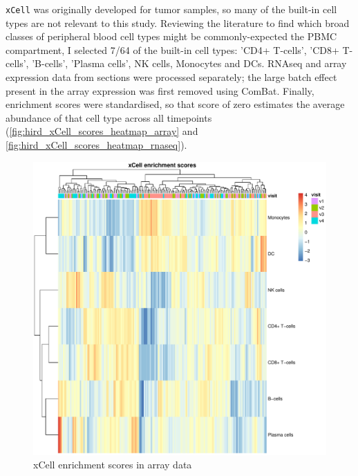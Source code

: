 %
\texttt{xCell} was originally developed for tumor samples, so many of the built-in cell types are not relevant to this study.
Reviewing the literature to find which broad classes of peripheral blood cell types might be commonly-expected the \gls{PBMC} compartment\autocite{davenport2018DiscoveringVivoCytokineeQTL},
I selected 7/64 of the built-in cell types: 'CD4+ T-cells', 'CD8+ T-cells', 'B-cells', 'Plasma cells', NK cells, Monocytes and DCs.
\gls{RNAseq} and array expression data from sections were processed separately; the large batch effect present in the array expression was first removed using ComBat.
Finally, enrichment scores were standardised, so that score of zero estimates the average abundance of that cell type across all timepoints (\autoref{fig:hird_xCell_scores_heatmap_array} and \autoref{fig:hird_xCell_scores_heatmap_rnaseq}).

\begin{figure}
    \centering
    \includegraphics[width=1.0\textwidth,page=1]{mainmatter/figures/chapter_03/get_xCell_estimates.dataset_array.plots.pdf}
    \caption{xCell enrichment scores in array data}
    \label{fig:hird_xCell_scores_heatmap_array}
\end{figure}

